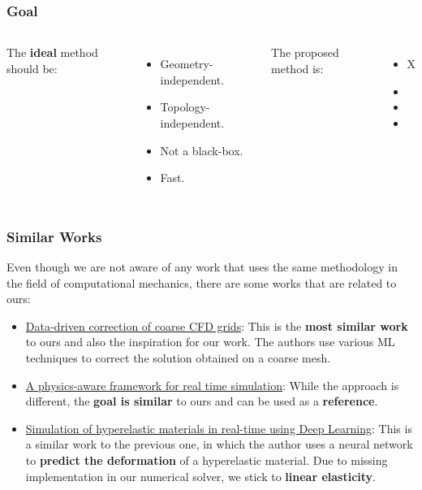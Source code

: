 \documentclass{beamer}
\begin{document}
\begin{frame}
\frametitle{Goal}
\begin{columns}
    The \textbf{ideal} method should be:
    \begin{itemize}
    \item Geometry-independent.
    \item Topology-independent.
    \item Not a black-box.
    \item Fast.
    \end{itemize}
    The proposed method is:
    \begin{itemize}
    \item[] X
    \item[] \checkmark
    \item[] \checkmark
    \item[] \checkmark
    \end{itemize}
\end{columns}
\end{frame}

\begin{frame}
\frametitle{Similar Works}
Even though we are not aware of any work that uses the same methodology in the field of computational mechanics, there are some works that are related to ours:
\begin{itemize}
    \item \href{https://www.sciencedirect.com/science/article/abs/pii/S0045793023001962}{Data-driven correction of coarse CFD grids}: This is the \textbf{most similar work} to ours and also the inspiration for our work. The authors use various ML techniques to correct the solution obtained on a coarse mesh.
    \item \href{https://arxiv.org/pdf/2109.09491}{A physics-aware framework for real time simulation}: While the approach is different, the \textbf{goal is similar} to ours and can be used as a \textbf{reference}.
    \item \href{https://arxiv.org/abs/1904.06197}{Simulation of hyperelastic materials in real-time using Deep Learning}: This is a similar work to the previous one, in which the author uses a neural network to \textbf{predict the deformation} of a hyperelastic material. Due to missing implementation in our numerical solver, we stick to \textbf{linear elasticity}.
\end{itemize}
\end{frame}
\end{document}
